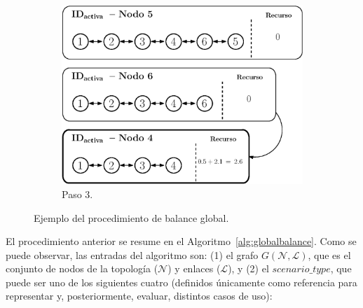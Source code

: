 \begin{figure}[H]
    \vspace{0.3cm}
    
    \begin{subfigure}{0.55\textwidth}
        \centering
        \includegraphics[width=\linewidth]{fig/05_den2ne/den2ne_13.eps}
        \caption{Paso 3.}
        \label{fig:den2ne_13}
    \end{subfigure}
    
    \caption{Ejemplo del procedimiento de balance global.}
    \label{fig:den2ne_balance}
\end{figure}


El procedimiento anterior se resume en el Algoritmo~\ref{alg:globalbalance}. Como se puede observar, las entradas del algoritmo son: (1) el grafo $G(\mathcal{N}, \mathcal{L})$, que es el conjunto de nodos de la topología ($\mathcal{N}$) y enlaces ($\mathcal{L}$), y (2) el $scenario\_type$, que puede ser uno de los siguientes cuatro (definidos únicamente como referencia para representar y, posteriormente, evaluar, distintos casos de uso): 


